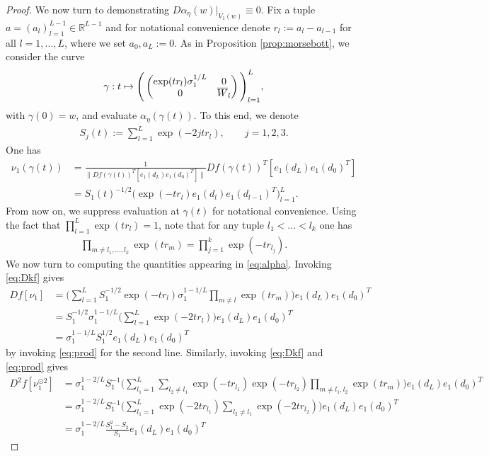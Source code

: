\documentclass{article}
\newcommand{\RB}{\mathbb{R}}
\newcommand{\bW}{\smash{\overline{W}}\vphantom{W}}
\theoremstyle{plain}
\theoremstyle{definition}
\theoremstyle{remark}
\begin{document}
\begin{proof}
    We now turn to demonstrating $D\alpha_{\eta}(w)|_{V_1(w)}\equiv 0$. Fix a tuple $a = (a_l)_{l=1}^{L-1}\in\RB^{L-1}$ and for notational convenience denote $r_l:=a_l-a_{l-1}$ for all $l=1,\dots,L$, where we set $a_0,a_L:=0$. As in Proposition \ref{prop:morsebott}, we consider the curve
    \begin{align}
    \gamma:t\mapsto \Bigg(\begin{pmatrix}\exp(tr_l)\sigma_1^{1/L} & 0 \\ 0 & \bW_l\end{pmatrix}\Bigg)_{l=1}^L,
    \end{align}
    with $\gamma(0) = w$, and evaluate $\alpha_{\eta}(\gamma(t))$. To this end, we denote
    \begin{align}
    S_j(t):=\sum_{l=1}^L\exp(-2jtr_l),\qquad j=1,2,3.
    \end{align}
    One has
    \begin{align}
    \nu_1(\gamma(t)) &= \frac{1}{\|Df(\gamma(t))^T[e_1(d_L)e_1(d_0)^T]\|}Df(\gamma(t))^T[e_1(d_L)e_1(d_0)^T]\\&=S_1(t)^{-1/2}\big(\exp(-tr_l)e_1(d_l)e_1(d_{l-1})^T\big)_{l=1}^L.
    \end{align}
    From now on, we suppress evaluation at $\gamma(t)$ for notational convenience. Using the fact that $\prod_{l=1}^L\exp(tr_l) = 1$, note that for any tuple $l_1<\dots<l_k$ one has
    \begin{align}\label{eq:prod}
        \prod_{m\neq l_1,\dots,l_k}\exp(tr_m) = \prod_{j=1}^k\exp(-tr_{l_j}).
    \end{align}
    We now turn to computing the quantities appearing in \eqref{eq:alpha}. Invoking \eqref{eq:Dkf} gives
    \begin{align}
        Df[\nu_1] &= \bigg(\sum_{l=1}^LS_1^{-1/2}\exp(-tr_l)\sigma_1^{1-1/L}\prod_{m\neq l}\exp(tr_m)\bigg)e_1(d_L)e_1(d_0)^T\\&=S_1^{-1/2}\sigma_1^{1-1/L}\bigg(\sum_{l=1}^L\exp(-2tr_l)\bigg)e_1(d_L)e_1(d_0)^T\\&=\sigma_1^{1-1/L}S_1^{1/2}e_1(d_L)e_1(d_0)^T
    \end{align}
    by invoking \eqref{eq:prod} for the second line. Similarly, invoking \eqref{eq:Dkf} and \eqref{eq:prod} gives
    \begin{align}
        D^2f[\nu_1^{\odot 2}] &= \sigma_1^{1-2/L}S_1^{-1}\bigg(\sum_{l_1=1}^L\sum_{l_2\neq l_1}\exp(-tr_{l_1})\exp(-tr_{l_2})\prod_{m\neq l_1,l_2}\exp(tr_m)\bigg)e_1(d_L)e_1(d_0)^T\\&=\sigma_1^{1-2/L}S_1^{-1}\bigg(\sum_{l_1=1}^L\exp(-2tr_{l_1})\sum_{l_2\neq l_1}\exp(-2tr_{l_2})\bigg)e_1(d_L)e_1(d_0)^T\\&=\sigma_1^{1-2/L}\frac{S_1^2-S_2}{S_1}e_1(d_L)e_1(d_0)^T

\end{align}
\end{proof}
\end{document}
